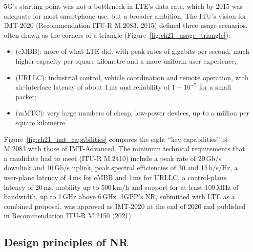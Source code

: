 5G's starting point was not a bottleneck in LTE's data rate, which by 2015 was adequate for most
smartphone use, but a broader ambition. The ITU's vision for IMT-2020 (Recommendation ITU-R M.2083,
2015) defined three usage scenarios, often drawn as the corners of a triangle
(Figure~\ref{fig:ch21_usage_triangle}):
\begin{itemize}
\item {} (eMBB): more of what LTE did, with peak rates of gigabits per
second, much higher capacity per square kilometre and a more uniform user experience;
\item {} (URLLC): industrial control, vehicle
coordination and remote operation, with air-interface latency of about 1\,ms and reliability of
$1-10^{-5}$ for a small packet;
\item {} (mMTC): very large numbers of cheap, low-power
devices, up to a million per square kilometre.
\end{itemize}

Figure~\ref{fig:ch21_imt_capabilities} compares the eight ``key capabilities'' of M.2083 with those
of IMT-Advanced. The minimum technical requirements that a candidate had to meet (ITU-R M.2410)
include a peak rate of 20\,Gb/s downlink and 10\,Gb/s uplink, peak spectral efficiencies of 30 and
15\,b/s/Hz, a user-plane latency of 4\,ms for eMBB and 1\,ms for URLLC, a control-plane latency of
20\,ms, mobility up to 500\,km/h and support for at least 100\,MHz of bandwidth, up to 1\,GHz above
6\,GHz. 3GPP's NR, submitted with LTE as a combined proposal, was approved as IMT-2020 at the end of
2020 and published in Recommendation ITU-R M.2150 (2021).


\subsection{Design principles of NR}

